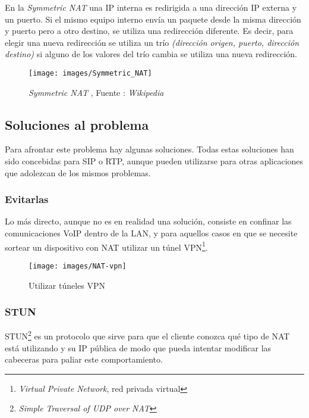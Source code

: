 En la \emph{Symmetric NAT} una IP interna es redirigida a una dirección IP externa y un puerto. Si el mismo equipo interno envía un paquete desde la misma dirección y puerto pero a otro destino, se utiliza una redirección diferente. Es decir, para elegir una nueva redirección se utiliza un trío \emph{(dirección origen, puerto, dirección destino)} si alguno de los valores del trío cambia se utiliza una nueva redirección.

\begin{figure}[!h]
  \centering
  \texttt{[image: images/Symmetric\_NAT]}
  \caption{\emph{Symmetric NAT} , Fuente : \emph{Wikipedia}}
  \label{fig:snat}
\end{figure}

\subsection{Soluciones al problema}
\label{sec:soluc-al-probl}

Para afrontar este problema hay algunas soluciones. Todas estas soluciones han sido concebidas para SIP o RTP, aunque pueden utilizarse para otras aplicaciones que adolezcan de los mismos problemas.

\subsubsection{Evitarlas}
\label{sec:evitarlas}

Lo más directo, aunque no es en realidad una solución, consiste en confinar las comunicaciones VoIP dentro de la LAN, y para aquellos casos en que se necesite sortear un dispositivo con NAT utilizar un túnel VPN\footnote{\emph{Virtual Private Network}, red privada virtual}.

\begin{figure}[!h]
  \centering
  \texttt{[image: images/NAT-vpn]}
  \caption{Utilizar túneles VPN}
  \label{fig:NAT-vpn}
\end{figure}

\subsubsection{STUN}
\label{sec:servidor-stun}

STUN\footnote{\emph{Simple Traversal of UDP over NAT}} es un protocolo que sirve para que el cliente conozca qué tipo de NAT está utilizando y su IP pública de modo que pueda intentar modificar las cabeceras para paliar este comportamiento.

